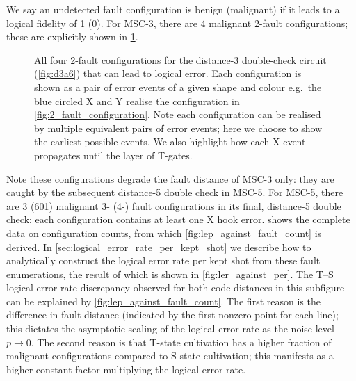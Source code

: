 We say an undetected fault configuration is
benign (malignant)
if it leads to a logical fidelity of 1 (0).
For MSC-3,
there are 4 malignant 2-fault configurations;
these are explicitly shown in \cref{fig:all_2_fault_configurations}.
\begin{figure}
	
	\caption{All four 2-fault configurations
	for the distance-3 double-check circuit (\cref{fig:d3a6})
	that can lead to logical error.
	Each configuration is shown as a pair of error events
	of a given shape and colour
	e.g.\ the blue circled X and Y realise
	the configuration in \cref{fig:2_fault_configuration}.
	Note each configuration can be realised by
	multiple equivalent pairs of error events;
	here we choose to show the earliest possible events.
	We also highlight how each X event propagates until the layer of T-gates.}
	\label{fig:all_2_fault_configurations}
\end{figure}
Note these configurations degrade the fault distance of MSC-3 only:
they are caught by the subsequent distance-5 double check in MSC-5.
For MSC-5,
there are 3 (601) malignant 3- (4-) fault configurations
in its final, distance-5 double check;
each configuration contains at least one X hook error.
 shows
the complete data on configuration counts,
from which \cref{fig:lep_against_fault_count} is derived.
In \cref{sec:logical_error_rate_per_kept_shot} we describe how to
analytically construct the logical error rate per kept shot
from these fault enumerations,
the result of which is shown in \cref{fig:ler_against_per}.
The T--S logical error rate discrepancy
observed for both code distances in this subfigure
can be explained by \cref{fig:lep_against_fault_count}.
The first reason is the difference in fault distance
(indicated by the first nonzero point for each line);
this dictates the asymptotic scaling
of the logical error rate as the noise level $p \to 0$.
The second reason is that T-state cultivation has
a higher fraction of malignant configurations
compared to S-state cultivation;
this manifests as a higher constant factor
multiplying the logical error rate.

